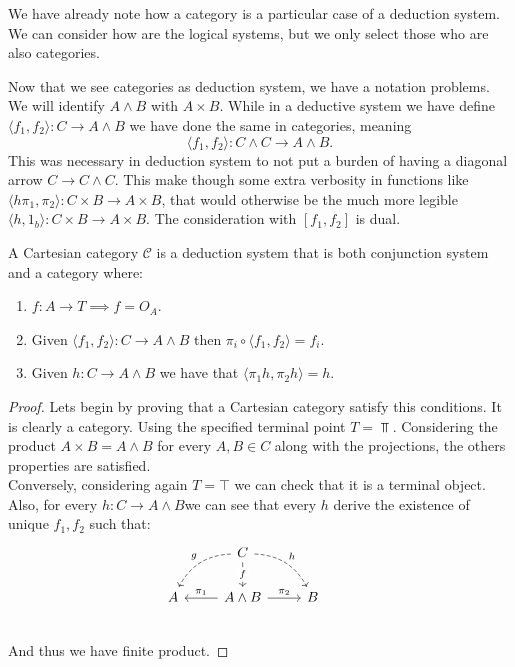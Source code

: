 We have already note how a category is a particular case of a deduction system. We can consider how are the logical systems, but we only select those who are also categories.

\begin{remark}Now that  we see categories as deduction system, we have a notation problems. We will identify $A\land B$ with $A\times B$. While in a deductive system we have define $\langle f_1,f_2\rangle : C \to A\land B$ we have done the same in categories, meaning $$\langle f_1,f_2\rangle : C \land C \to A \land B.$$  This was necessary in deduction system to not put a burden of having a diagonal arrow $C\to C\land C$. This make though some extra verbosity in functions like $\langle h\pi_1, \pi_2\rangle : C\times B \to A\times B$, that would otherwise be the much more legible $\langle h, 1_b\rangle: C\times B \to A \times B$.  The consideration with $[f_1,f_2]$ is dual.
\end{remark}


\begin{proposition}\label{prop:CartCategory2}
  A Cartesian category $\mathcal{C}$ is a deduction system that is both conjunction system and a category where:
  \begin{enumerate}
  \item $f:A\to T\implies f=O_A$.
  \item Given $\langle f_1,f_2\rangle: C\to A\land B$ then $\pi_i \circ \langle f_1,f_2\rangle = f_i$.
  \item Given $h:C\to A\land B$ we have that $\langle \pi_1 h, \pi_2 h\rangle = h$.
  \end{enumerate}
\end{proposition}

\begin{proof}

  Lets begin by proving that a Cartesian category satisfy this conditions. It is clearly a category. Using the specified terminal point $T=\Top$.  Considering the product $A\times B = A\land B$ for every $A,B \in C$ along with the projections, the others properties are satisfied.\\

  Conversely, considering again $T= \top$ we can check that it is a terminal object. Also, for every $h:C\to A\land B$we can see that every $h$ derive the existence of unique $f_1,f_2$ such that:
  \[
    \begin{tikzcd}
      {} & C \arrow[bend right,swap,dashed]{dl}{g}
      \arrow[bend left,dashed]{dr}{h} \arrow{d}[description]{f}& & \\
      A  &A\land B \arrow{l}[swap]{\pi_1} \arrow{r}{\pi_2} & 
      B \\
    \end{tikzcd}
  \]
  And thus we have finite product.
\end{proof}


